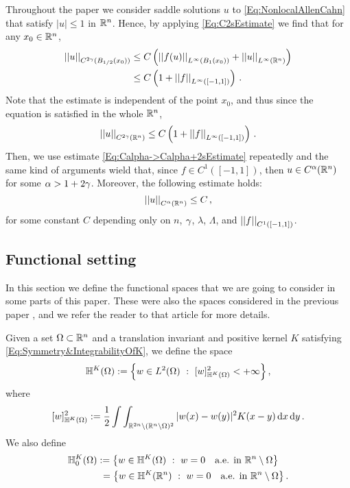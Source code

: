 Throughout the paper we consider saddle solutions $u$ to \eqref{Eq:NonlocalAllenCahn} that satisfy $|u|\leq 1$ in $\mathbb{R}^n$. Hence, by applying \eqref{Eq:C2sEstimate} we find that for any $x_0\in \mathbb{R}^n$,
\begin{align*}
\left | \left |{u} \right | \right |_{C^{2\gamma} (B_{1/2} (x_0))} &\leq C\left ( {\left | \left |{f(u)} \right | \right |_{L^\infty (B_1(x_0))} + \left | \left |{u} \right | \right |_{L^\infty  (\mathbb{R}^n)} }\right ) \\
&\leq C\left ( {1 + \left | \left |{f} \right | \right |_{L^\infty ([-1,1])} }\right )\,.
\end{align*}
Note that the estimate is independent of the point $x_0$, and thus since the equation is satisfied in the whole $\mathbb{R}^n$,
$$
\left | \left |{u} \right | \right |_{C^{2\gamma}(\mathbb{R}^n)} \leq C\left ( {1 + \left | \left |{f} \right | \right |_{L^\infty ([-1,1])} }\right )\,.
$$
Then, we use estimate \eqref{Eq:Calpha->Calpha+2sEstimate} repeatedly and the same kind of arguments wield that, since $f\in C^{1}([-1,1])$, then $u\in C^{\alpha}(\mathbb{R}^n)$ for some $\alpha > 1+ 2 \gamma$. Moreover, the following estimate holds:
$$
\left | \left |{u} \right | \right |_{C^{\alpha}(\mathbb{R}^n)} \leq C\,,
$$
for some constant $C$ depending only on $n$, $\gamma$, $\lambda$, $\Lambda$, and $\left | \left |{f} \right | \right |_{C^1([-1,1])}$.


\subsection{Functional setting}
\label{Subsec:Functional setting}



In this section we define the functional spaces that we are going to consider in some parts of this paper. These were also the spaces considered in the previous paper \cite{FelipeSanz-Perela:IntegroDifferentialI}, and we refer the reader to that article for more details.

Given a set $\Omega \subset \mathbb{R}^n$ and a translation invariant and positive kernel $K$ satisfying \eqref{Eq:Symmetry&IntegrabilityOfK}, we define the space
$$
\mathbb{H}^K(\Omega) := \left \{ w \in L^2(\Omega) \ : \ [w]^2_{\mathbb{H}^K(\Omega)} < + \infty \right \},
$$
where
$$
[w]^2_{\mathbb{H}^K(\Omega)} := \dfrac{1}{2}\int\int_{\mathbb{R}^{2n} \setminus (\mathbb{R}^n\setminus\Omega)^2} |w(x) - w(y)|^2 K(x-y) \,\mathrm{d} x \,\mathrm{d} y\,.
$$
We also define
\begin{align*}
\mathbb{H}^K_0(\Omega) &:= \left \{ w \in \mathbb{H}^K(\Omega) \ : \  w = 0 \quad \textrm{a.e. in } \mathbb{R}^n \setminus \Omega \right \} \\
&\ = \left \{ w \in \mathbb{H}^K(\mathbb{R}^n) \ : \  w = 0 \quad \textrm{a.e. in } \mathbb{R}^n \setminus \Omega \right \}.
\end{align*}

